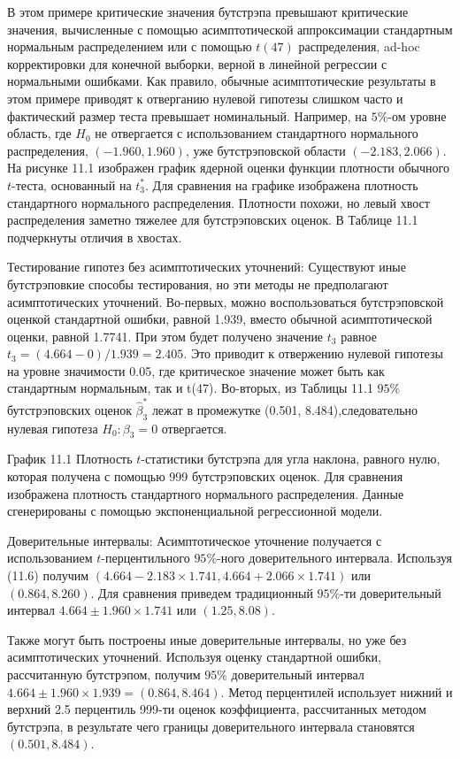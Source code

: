 В этом примере критические значения бутстрэпа превышают критические значения, вычисленные с помощью асимптотической аппроксимации стандартным нормальным распределением или с помощью $t(47)$ распределения, ad-hoc корректировки для конечной выборки, верной в линейной регрессии с нормальными ошибками. Как правило, обычные асимптотические результаты в этом примере приводят к отверганию нулевой гипотезы слишком часто и фактический размер теста превышает номинальный. Например, на $5\%$-ом уровне область, где $H_0$ не отвергается с использованием стандартного нормального распределения, $(-1.960, 1.960)$, уже бутстрэповской области $(-2.183, 2.066)$. На рисунке 11.1 изображен график ядерной оценки функции плотности обычного $t$-теста, основанный на $t_3^*$. Для сравнения на графике изображена плотность стандартного нормального распределения. Плотности похожи, но левый хвост распределения заметно тяжелее для бутстрэповских оценок. В Таблице 11.1 подчеркнуты отличия в хвостах.

Тестирование гипотез без асимптотических уточнений: Существуют иные бутстрэповкие способы тестирования, но эти методы не предполагают асимптотических уточнений. Во-первых, можно воспользоваться бутстрэповской оценкой стандартной ошибки, равной 1.939, вместо обычной асимптотической оценки, равной 1.7741. При этом  будет получено значение $t_3$ равное $t_3=(4.664-0)/1.939=2.405$. Это приводит к отвержению нулевой гипотезы на уровне значимости 0.05, где критическое значение может быть как стандартным нормальным, так и t(47). Во-вторых, из Таблицы 11.1 $95\%$ бутстрэповских оценок $\hat{\beta}_3^*$ лежат в промежутке (0.501, 8.484),следовательно нулевая гипотеза $H_0:\beta_3=0$ отвергается.

\vspace{3cm}

График 11.1 Плотность $t$-статистики бутстрэпа для угла наклона, равного нулю, которая получена с помощью 999 бутстрэповских оценок. Для сравнения изображена плотность стандартного нормального распределения. Данные сгенерированы с помощью экспоненциальной регрессионной модели.


Доверительные интервалы: Асимптотическое уточнение получается с использованием $t$-перцентильного $95\%$-ного
доверительного интервала. Используя (11.6) получим  $(4.664-2.183 \times 1.741,4.664+2.066 \times 1.741)$ или $(0.864,8.260)$. Для  сравнения приведем традиционный $95\%$-ти доверительный интервал $4.664 \pm 1.960 \times 1.741$ или $(1.25, 8.08)$.

Также могут быть построены иные доверительные интервалы, но уже без асимптотических уточнений. Используя оценку стандартной ошибки, рассчитанную бутстрэпом, получим $95\%$ доверительный интервал $4.664 \pm 1.960 \times 1.939=(0.864,8.464)$. Метод перцентилей использует нижний и верхний 2.5 перцентиль 999-ти оценок коэффициента, рассчитанных методом бутстрэпа, в результате чего границы доверительного интервала становятся $(0.501,8.484)$.
 
